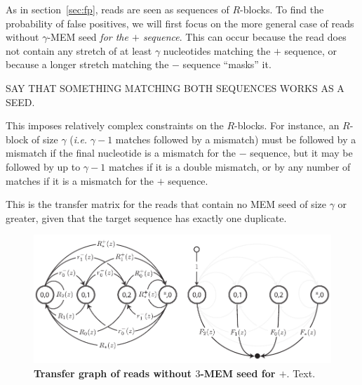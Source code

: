 \documentclass{article}
\begin{document}
As in section~\ref{sec:fp}, reads are seen as sequences of $R$-blocks. To
find the probability of false positives, we will first focus on the more
general case of reads without $\gamma$-MEM seed \emph{for the $+$
sequence}. This can occur because the read does not contain any stretch of
at least $\gamma$ nucleotides matching the $+$ sequence, or because a
longer stretch matching the $-$ sequence ``masks'' it.

SAY THAT SOMETHING MATCHING BOTH SEQUENCES WORKS AS A SEED.

This imposes relatively complex constraints on the $R$-blocks. For
instance, an $R$-block of size $\gamma$ (\textit{i.e.} $\gamma-1$ matches
followed by a mismatch) must be followed by a mismatch if the final
nucleotide is a mismatch for the $-$ sequence, but it may be followed by
up to $\gamma-1$ matches if it is a double mismatch, or by any number of
matches if it is a mismatch for the $+$ sequence.

This is the transfer matrix for the reads that contain no MEM seed of size
$\gamma$ or greater, given that the target sequence has exactly one
duplicate.

\begin{figure}[h]
\centering
\includegraphics[scale=0.79]{MEM_graph.pdf}
\caption{\textbf{Transfer graph of reads without $3$-MEM seed for $+$}.
Text.}
\label{fig:graph_mem}
\end{figure}
\end{document}
